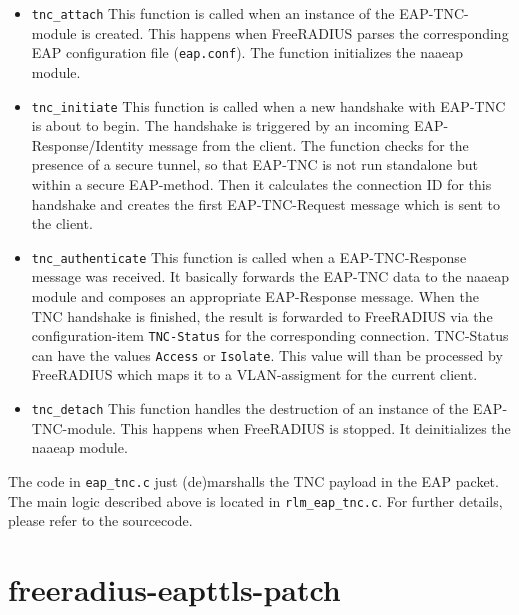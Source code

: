 \documentclass[a4paper,10pt]{scrartcl}
\begin{document}
\begin{itemize}
	\item \texttt{tnc\_attach} This function is called when an instance of the EAP-TNC-module is created. This happens when FreeRADIUS parses the corresponding EAP configuration
	file (\texttt{eap.conf}). The function initializes the naaeap module.
	\item \texttt{tnc\_initiate} This function is called when a new handshake with EAP-TNC is about to begin. The handshake is triggered by an incoming EAP-Response/Identity message from the client.
    The function checks for the presence of a secure tunnel, so that EAP-TNC is not run standalone but within a secure EAP-method. Then it calculates the connection ID for this handshake and creates 
    the first EAP-TNC-Request message which is sent to the client.
	\item \texttt{tnc\_authenticate} This function is called when a EAP-TNC-Response message was received. It basically forwards the EAP-TNC data to the naaeap module and composes an appropriate EAP-Response message. When the TNC handshake is finished, the result is forwarded to FreeRADIUS via the configuration-item \texttt{TNC-Status} for the corresponding connection. TNC-Status can have the values \texttt{Access} or \texttt{Isolate}. This value will than be processed by FreeRADIUS which maps it to a VLAN-assigment for the current client.
	\item \texttt{tnc\_detach} This function handles the destruction of an instance of the EAP-TNC-module. This happens when FreeRADIUS is stopped. It deinitializes the naaeap module.
\end{itemize}

The code in \texttt{eap\_tnc.c} just (de)marshalls the TNC payload in the EAP packet. The main logic described above is located in \texttt{rlm\_eap\_tnc.c}.
For further details, please refer to the sourcecode.

\section{freeradius-eapttls-patch}







\end{document}
